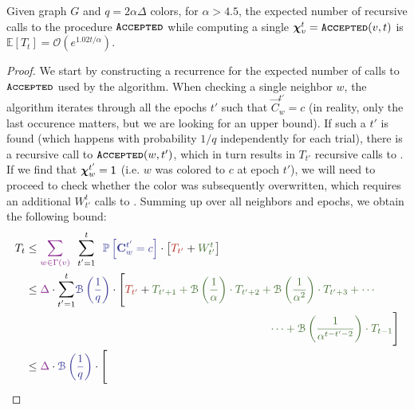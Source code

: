 \begin{lemma}
\label{lem:coloring_recurrence}
Given graph $G$ and $q=2\alpha\Delta$ colors, for $\alpha > 4.5$, the expected number of recursive calls to the procedure $\texttt{\textsc{Accepted}}$
while computing a single $\bm\chi^t_v = \texttt{\textsc{Accepted}}(v,t)$ is $\mathbb E[T_t] = \mathcal{O}\left(e^{1.02t/\alpha}\right)$.
\end{lemma}
\begin{proof}
We start by constructing a recurrence for the expected number of calls to $\texttt{\textsc{Accepted}}$ used by the algorithm.
When checking a single neighbor $w$, the algorithm iterates through all the epochs $t'$ such that $\vec C^{t'}_w = c$
(in reality, only the last occurence matters, but we are looking for an upper bound).
If such a $t'$ is found (which happens with probability $1/q$ independently for each trial), there is a recursive call to $\texttt{\textsc{Accepted}}(w,t')$,
which in turn results in $T_{t'}$ recursive calls to .
If we find that $\bm\chi^{t'}_w = \mathsf{1}$ (i.e. $w$ was colored to $c$ at epoch $t'$),
we will need to proceed to check whether the color was subsequently overwritten, which requires an additional $W^t_{t'}$ calls to .
Summing up over all neighbors and epochs, we obtain the following bound:
\begin{align}
T_{t} &\le \textcolor{Fuchsia}{\mathlarger\sum\limits_{w\in \Gamma(v)}}\ \
\mathlarger\sum\limits_{t'=1}^{t}\ \  \textcolor{Blue}{\mathbb P\left[\vec C^{t'}_w = c\right]}\cdot
\left[ \textcolor{BrickRed}{T_{t'}} + \textcolor{OliveGreen!80!black}{W^t_{t'}} \right] \\
&\le \textcolor{Fuchsia}{\Delta} \cdot \mathlarger\sum\limits_{t'=1}^{t} \textcolor{Blue}{\mathcal B\left( \frac 1q\right)}\cdot
\Biggl[ \textcolor{BrickRed}{T_{t'}} +
\textcolor{OliveGreen!80!black}{T_{t'+1} + \mathcal B\left(\frac{1}{\alpha}\right)\cdot T_{t'+2} +
\mathcal B\left(\frac{1}{\alpha^2}\right)\cdot T_{t'+3} + \cdots} \notag\\
&\phantom{{}=3} \phantom{{}=3} \phantom{{}=3} \phantom{{}=3} \phantom{{}=3} \phantom{{}=3}
\phantom{{}=3} \phantom{{}=3} \phantom{{}=3} \phantom{{}=3} \phantom{{}=3} \phantom{{}=3}
\textcolor{OliveGreen!80!black}{\cdots + \mathcal B\left(\frac{1}{\alpha^{t-t'-2}}\right)\cdot T_{t-1}} \Biggr]\\
&\le \textcolor{Fuchsia}{\Delta} \cdot \textcolor{Blue}{\mathcal B\left( \frac{1}{q}\right)} \cdot \Biggl[

\end{align}
\end{proof}
